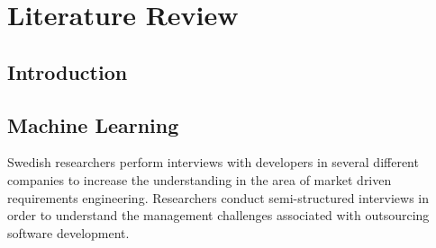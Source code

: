 
\chapter{Literature Review} %

\label{Chapter2} %



\section{Introduction}
\section{Machine Learning}

Swedish researchers perform interviews with developers in several different companies to increase the understanding in the area of market driven requirements engineering.\cite{Interview1}
Researchers conduct semi-structured interviews in order to understand the management challenges associated with outsourcing software development.\cite{Interview2}

\subsection{}

\subsection{}

\subsection{}

